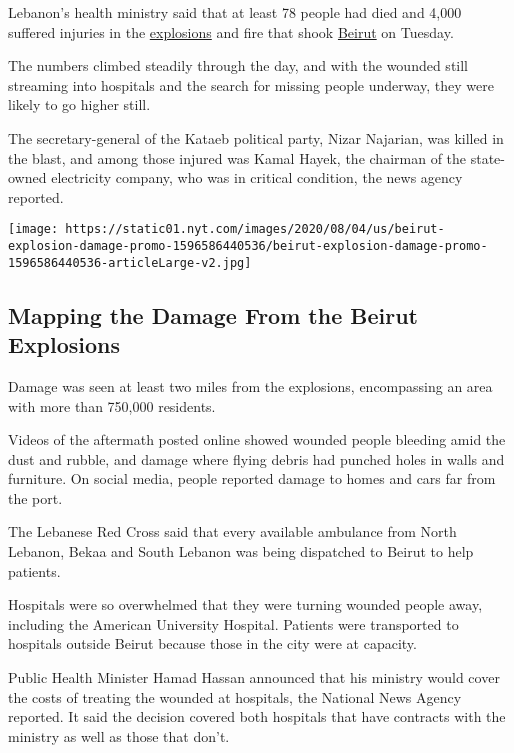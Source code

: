 Lebanon's health ministry said that at least 78 people had died and
4,000 suffered injuries in the
\href{https://www.nytimes.com/2020/08/04/world/middleeast/lebanon-explosion-beirut.html}{explosions}
and fire that shook
\href{https://www.nytimes.com/2020/08/04/world/middleeast/lebanon-explosion-beirut.html}{Beirut}
on Tuesday.

The numbers climbed steadily through the day, and with the wounded still
streaming into hospitals and the search for missing people underway,
they were likely to go higher still.

The secretary-general of the Kataeb political party, Nizar Najarian, was
killed in the blast, and among those injured was Kamal Hayek, the
chairman of the state-owned electricity company, who was in critical
condition, the news agency reported.

\href{https://www.nytimes.com/interactive/2020/08/04/world/middleeast/beirut-explosion-damage.html}{}

\texttt{[image: https://static01.nyt.com/images/2020/08/04/us/beirut-explosion-damage-promo-1596586440536/beirut-explosion-damage-promo-1596586440536-articleLarge-v2.jpg]}

\hypertarget{mapping-the-damage-from-the-beirut-explosions}{%
\subsection{Mapping the Damage From the Beirut
Explosions}\label{mapping-the-damage-from-the-beirut-explosions}}

Damage was seen at least two miles from the explosions, encompassing an
area with more than 750,000 residents.

Videos of the aftermath posted online showed wounded people bleeding
amid the dust and rubble, and damage where flying debris had punched
holes in walls and furniture. On social media, people reported damage to
homes and cars far from the port.

The Lebanese Red Cross said that every available ambulance from North
Lebanon, Bekaa and South Lebanon was being dispatched to Beirut to help
patients.

Hospitals were so overwhelmed that they were turning wounded people
away, including the American University Hospital. Patients were
transported to hospitals outside Beirut because those in the city were
at capacity.

Public Health Minister Hamad Hassan announced that his ministry would
cover the costs of treating the wounded at hospitals, the National News
Agency reported. It said the decision covered both hospitals that have
contracts with the ministry as well as those that don't.

